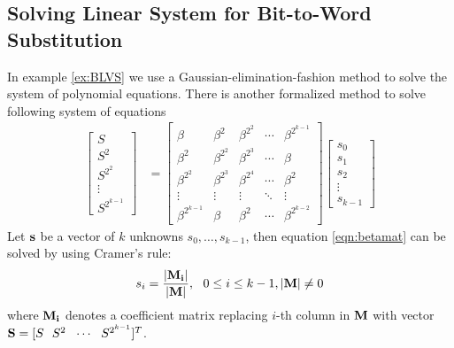 \subsection{Solving Linear System for Bit-to-Word Substitution}
In example \ref{ex:BLVS} we use a Gaussian-elimination-fashion method to solve the system of polynomial
equations. There is another formalized method to solve following system of equations
\begin{align}
\label{eqn:betamat}
\begin{bmatrix}
S \\
S^2 \\
S^{2^2} \\
\vdots \\
S^{2^{k-1}}
\end{bmatrix}
&=
\begin{bmatrix}
\beta & \beta^{2} & \beta^{2^2} & \cdots & \beta^{2^{k-1}}\\
\beta^{2} & \beta^{2^2} & \beta^{2^3} & \cdots & \beta \\
\beta^{2^2} & \beta^{2^3} & \beta^{2^4} & \cdots & \beta^2\\
\vdots & \vdots & \vdots & \ddots & \vdots \\
\beta^{2^{k-1}} & \beta & \beta^2 & \cdots & \beta^{2^{k-2}}
\end{bmatrix}
\begin{bmatrix}
s_0\\
s_1\\
s_2\\
\vdots\\
s_{k-1}
\end{bmatrix}
\end{align}
Let ${\bf s}$ be a vector of $k$ unknowns $s_0,\dots,s_{k-1}$,
then equation \ref{eqn:betamat} can be solved by using Cramer's rule:
\begin{equation}
\label{eqn:Cramer}
s_i = \frac{{|\bf M_i|}}{{|\bf M}|}, \ \ 0\leq i\leq k-1, {|\bf M}| \neq 0
\end{equation}
where ${\bf M_i}$ denotes a coefficient matrix replacing $i$-th column in ${\bf M}$ with
vector ${\bf S} = [S~~S^2~~\cdots~~S^{2^{k-1}}]^T$.

